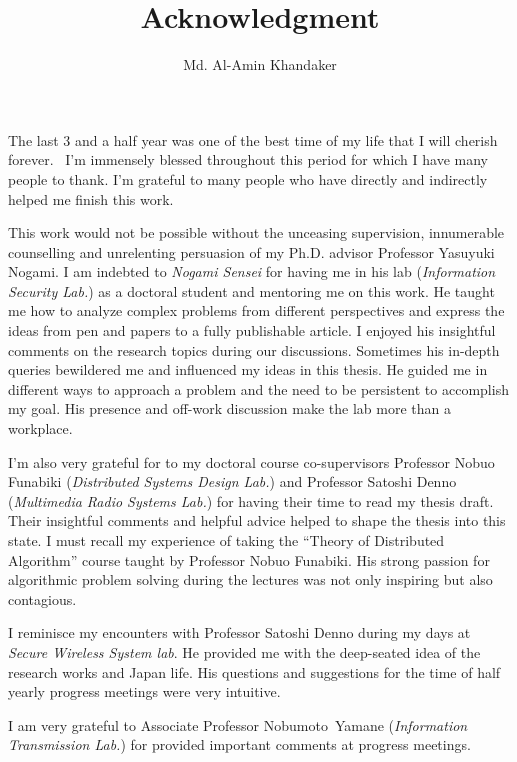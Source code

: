 \documentclass[a4paper]{article}
\title{Acknowledgment}
\author{Md. Al-Amin Khandaker}
\begin{document}
\maketitle


The last 3 and a half year was one of the best time of my life that I will cherish forever. 
I'm immensely blessed throughout this period for which I have many people to thank.
I'm grateful to many people who have directly and indirectly helped me finish this work.

\vspace{5pt}
This work would not be possible without the unceasing supervision, innumerable counselling and unrelenting persuasion of my Ph.D. advisor Professor Yasuyuki Nogami.
I am indebted to \textit{Nogami Sensei} for having me in his lab (\textit{Information Security Lab.}) as a doctoral student and mentoring me on this work.
He taught me how to analyze complex problems from different perspectives and express the ideas from pen and papers to a fully publishable article.
I enjoyed his insightful comments on the research topics during our discussions.
Sometimes his in-depth queries bewildered me and influenced my ideas in this thesis.
He guided me in different ways to approach a problem and the need to be persistent to accomplish my goal.
His presence and off-work discussion make the lab more than a workplace. 

\vspace{5pt}
I’m also very grateful for to my doctoral course co-supervisors Professor Nobuo Funabiki (\textit{Distributed Systems Design Lab.}) and Professor Satoshi Denno (\textit{Multimedia Radio Systems Lab.}) for having their time to read my thesis draft.
Their insightful comments and helpful advice helped to shape the thesis into this state.
I must recall my experience of taking the “Theory of Distributed Algorithm” course taught by Professor Nobuo Funabiki.
His strong passion for algorithmic problem solving during the lectures was not only inspiring but also contagious. 

\vspace{5pt}
I reminisce my encounters with Professor Satoshi Denno during my days at \textit{Secure Wireless System lab}.
He provided me with the  deep-seated idea of the research works and Japan life.
His questions and suggestions for the time of half yearly progress meetings were very intuitive. 

\vspace{5pt}
I am very grateful to Associate Professor \mbox{Nobumoto Yamane} (\textit{Information Transmission Lab.}) for provided important comments at progress meetings.
\end{document}

